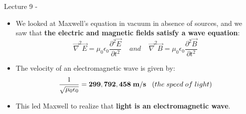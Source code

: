 
\renewcommand{\summarizedlecture}{9 }

%
%
%

\begin{frame}{Lecture \summarizedlecture - \lecturesummarytitle}

\begin{itemize}

\item
We looked at Maxwell's equation in vacuum in absence of sources, and we
saw that {\bf the electric and magnetic fields satisfy a wave equation}:
\begin{equation*}
  \vec{\nabla}^{2} \vec{E} = \mu_0 \epsilon_0 \frac{\partial^{2} \vec{E}}{\partial t^{2}}
  \;\;\;\; and \;\;\;\;
  \vec{\nabla}^{2} \vec{B} = \mu_0 \epsilon_0 \frac{\partial^{2} \vec{B}}{\partial t^{2}}
\end{equation*}

\item
The velocity of an electromagnetic wave is given by:
\begin{equation*}
    \frac{1}{\sqrt{\mu_0 \epsilon_0}} = {\bf 299,792,458 \; m/s}  \;\;\;(the \; speed \; of \; light)
\end{equation*}

\item
This led Maxwell to realize that {\bf light is an electromagnetic wave}.

\end{itemize}

\end{frame}

%
%
%

